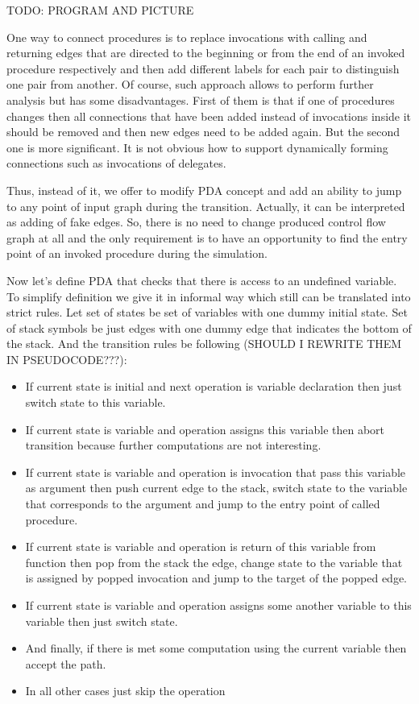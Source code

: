 TODO: PROGRAM AND PICTURE

One way to connect procedures is to replace invocations with calling and returning edges that are directed to the beginning or from the end of an invoked procedure respectively and then add different labels for each pair to distinguish one pair from another.
Of course, such approach allows to perform further analysis but has some disadvantages.
First of them is that if one of procedures changes then all connections that have been added instead of invocations inside it should be removed and then new edges need to be added again.
But the second one is more significant.
It is not obvious how to support dynamically forming connections such as invocations of delegates.

Thus, instead of it, we offer to modify PDA concept and add an ability to jump to any point of input graph during the transition.
Actually, it can be interpreted as adding of fake edges.
So, there is no need to change produced control flow graph at all and the only requirement is to have an opportunity to find the entry point of an invoked procedure during the simulation.

Now let's define PDA that checks that there is access to an undefined variable.
To simplify definition we give it in informal way which still can be translated into strict rules.
Let set of states be set of variables with one dummy initial state.
Set of stack symbols be just edges with one dummy edge that indicates the bottom of the stack.
And the transition rules be following (SHOULD I REWRITE THEM IN PSEUDOCODE???):
\begin{itemize}
	\item If current state is initial and next operation is variable declaration then just switch state to this variable.
	\item If current state is variable and operation assigns this variable then abort transition because further computations are not interesting.
	\item If current state is variable and operation is invocation that pass this variable as argument then push current edge to the stack, switch state to the variable that corresponds to the argument and jump to the entry point of called procedure.
	\item If current state is variable and operation is return of this variable from function then pop from the stack the edge, change state to the variable that is assigned by popped invocation and jump to the target of the popped edge.
	\item If current state is variable and operation assigns some another variable to this variable then just switch state.
	\item And finally, if there is met some computation using the current variable then accept the path.
	\item In all other cases just skip the operation
\end{itemize}

